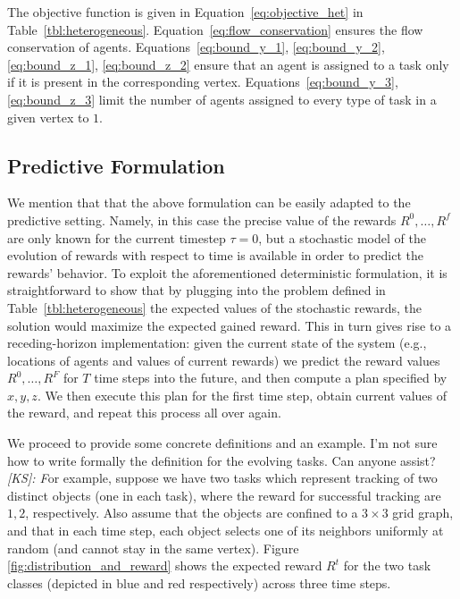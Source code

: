 \documentclass[conference]{IEEEtran}
\newcommand{\ksline}[2]{{\color{blue}#1}{\em \color{blue}[KS]: #2}}
\newcommand{\todo}[1]{{\color{red}{\bf TODO:} #1}}
\newcommand{\ksline}[2]{#1}
\newcommand{\todo}[1]{}
\begin{document}
The objective function is given in Equation~\eqref{eq:objective_het} in Table~\ref{tbl:heterogeneous}. Equation~\eqref{eq:flow_conservation} ensures the flow conservation of agents. 
Equations~\eqref{eq:bound_y_1}, \eqref{eq:bound_y_2}, \eqref{eq:bound_z_1}, \eqref{eq:bound_z_2} ensure that an agent is assigned to a task only if it is present in the corresponding vertex.    Equations~\eqref{eq:bound_y_3}, \eqref{eq:bound_z_3} limit the number of agents assigned to every type of task in a given vertex to $1$. 

\subsection{Predictive Formulation}\label{sec:predictive}
We mention that that the above formulation can be easily adapted to the predictive setting. Namely, in this case the precise value of the rewards $R^0,\ldots,R^f$ are only known for the current timestep $\tau=0$, but a stochastic model of the evolution of rewards with respect to time is available in order to predict the rewards' behavior. To exploit the aforementioned deterministic formulation, it is straightforward to show that by plugging into the problem defined in Table~\ref{tbl:heterogeneous} the expected values of the stochastic rewards, the solution would maximize the expected gained reward. This in turn gives rise to a receding-horizon implementation: given the current state of the system (e.g., locations of agents and values of current rewards) we predict the reward values $R^0,\ldots,R^F$ for $T$ time steps into the future, and then compute a plan specified by $x,y,z$. We then execute this plan for the first time step, obtain current values of the reward, and repeat this process all over again. 

We proceed to provide some concrete definitions and an example.
\ksline{I'm not sure how to write formally the definition for the evolving tasks. Can anyone assist?}

For example, suppose we have two tasks which represent tracking of two distinct objects (one in each task), where the reward for successful tracking are $1, 2$, respectively. Also assume that the objects are confined to a $3\times 3$ grid graph, and that in each time step, each object selects one of its neighbors uniformly at random (and cannot stay in the same vertex). Figure \ref{fig:distribution_and_reward} shows the expected reward $R^t$ for the two task classes (depicted in blue and red respectively) across three time steps.
\end{document}
